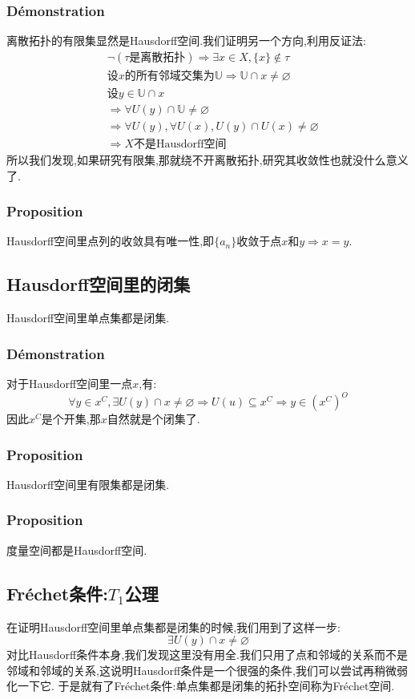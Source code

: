 \documentclass[12pt, a4paper, oneside]{ctexbook}
\begin{document}
  \subsubsection{Démonstration}
  离散拓扑的有限集显然是Hausdorff空间.我们证明另一个方向,利用反证法:
  $$
  \begin{aligned}&
    \lnot (\tau\text{是离散拓扑})\Rightarrow \exists x\in X, \{x\}\notin \tau\\&
    \text{设}x \text{的所有邻域交集为}\mathbb{U}\Rightarrow\mathbb{U}\cap x\neq\varnothing \\&
    \text{设}y\in\mathbb{U}\cap x\\&
    \Rightarrow \forall U(y)\cap\mathbb{U}\neq\varnothing\\&
    \Rightarrow \forall U(y),\forall U(x),U(y)\cap U(x)\neq\varnothing\\&
    \Rightarrow X\text{不是Hausdorff空间}
    \end{aligned}
  $$
  所以我们发现,如果研究有限集,那就绕不开离散拓扑,研究其收敛性也就没什么意义了.
  \subsubsection{Proposition}
  Hausdorff空间里点列的收敛具有唯一性,即$\{a_n\}$收敛于点$x$和$y\Rightarrow x=y$.
  \subsection{Hausdorff空间里的闭集}
  Hausdorff空间里单点集都是闭集.
  \subsubsection{Démonstration}
  对于Hausdorff空间里一点$x$,有:
  $$
  \forall y\in x^C, \exists U(y)\cap x\neq\varnothing\Rightarrow U(u)\subseteq x^C\Rightarrow y\in(x^C)^O
  $$因此$x^C$是个开集,那$x$自然就是个闭集了.
  \subsubsection{Proposition}
  Hausdorff空间里有限集都是闭集.
  \subsubsection{Proposition}
  度量空间都是Hausdorff空间.

  \subsection{Fréchet条件:$T_1$公理}
  在证明Hausdorff空间里单点集都是闭集的时候,我们用到了这样一步:
  $$
  \exists U(y)\cap x\neq\varnothing
  $$
  对比Hausdorff条件本身,我们发现这里没有用全.我们只用了点和邻域的关系而不是邻域和邻域的关系,这说明Hausdorff条件是一个很强的条件,我们可以尝试再稍微弱化一下它.
  于是就有了Fréchet条件:单点集都是闭集的拓扑空间称为Fréchet空间.
\end{document}
